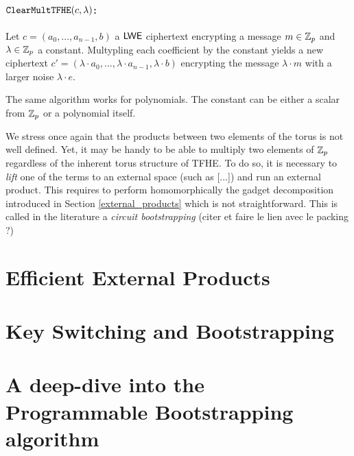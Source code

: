 \paragraph{$\texttt{ClearMultTFHE}(c, \lambda)$:} Let $c = (a_0, \dots, a_{n-1}, b)$ a $\textsf{LWE}$ ciphertext encrypting a message $m \in \mathbb{Z}_p$ and $\lambda \in \mathbb{Z}_p$ a constant. Multypling each coefficient by the constant yields a new ciphertext $c' = (\lambda \cdot a_0, \dots, \lambda \cdot a_{n-1}, \lambda \cdot b)$ encrypting the message $\lambda \cdot m$ with a larger noise $\lambda \cdot e$.

The same algorithm works for polynomials. The constant can be either a scalar from $\mathbb{Z}_p$ or a polynomial itself.




We stress once again that the products between two elements of the torus is not well defined. Yet, it may be handy to be able to multiply two elements of $\mathbb{Z}_p$ regardless of the inherent torus structure of TFHE. To do so, it is necessary to \textit{lift} one of the terms to an external space (such as [...]) and run an external product. This requires to perform homomorphically the gadget decomposition introduced in Section \ref{external_products} which is not straightforward. This is called in the literature a \textit{circuit bootstrapping} (citer et faire le lien avec le packing ?)


\section{Efficient External Products}







\section{Key Switching and Bootstrapping}







\section{A deep-dive into the Programmable Bootstrapping algorithm}

